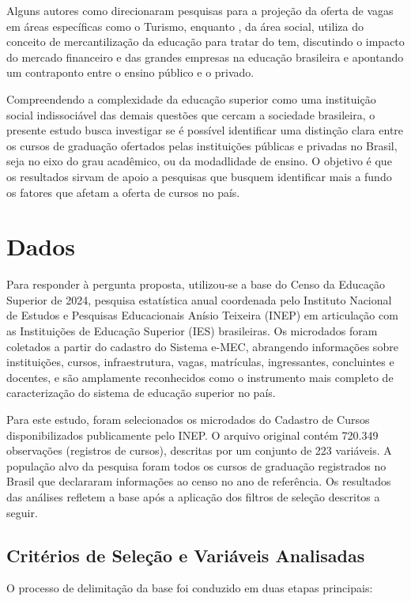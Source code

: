 \documentclass[12pt]{article}
\begin{document}
Alguns autores como \textcite{motaEDUCACAOSUPERIOREM2012} direcionaram pesquisas para a projeção da oferta de vagas em áreas específicas como o Turismo, enquanto \textcite{carvalhoMercantilizacaoEducacaoSuperior2013}, da área social, utiliza do conceito de mercantilização da educação para tratar do tem, discutindo o impacto do mercado financeiro e das grandes empresas na educação brasileira e apontando um contraponto entre o ensino público e o privado.

Compreendendo a complexidade da educação superior como uma instituição social indissociável das demais questões que cercam a sociedade brasileira, o presente estudo busca investigar se é possível identificar uma distinção clara entre os cursos de graduação ofertados pelas instituições públicas e privadas no Brasil, seja no eixo do grau acadêmico, ou da modadlidade de ensino. O objetivo é que os resultados sirvam de apoio a pesquisas que busquem identificar mais a fundo os fatores que afetam a oferta de cursos no país.

\section{Dados}
Para responder à pergunta proposta, utilizou-se a base do Censo da Educação Superior de 2024, pesquisa estatística anual coordenada pelo Instituto Nacional de Estudos e Pesquisas Educacionais Anísio Teixeira (INEP) em articulação com as Instituições de Educação Superior (IES) brasileiras. Os microdados foram coletados a partir do cadastro do Sistema e-MEC, abrangendo informações sobre instituições, cursos, infraestrutura, vagas, matrículas, ingressantes, concluintes e docentes, e são amplamente reconhecidos como o instrumento mais completo de caracterização do sistema de educação superior no país.

Para este estudo, foram selecionados os microdados do Cadastro de Cursos disponibilizados publicamente pelo INEP. O arquivo original contém 720.349 observações (registros de cursos), descritas por um conjunto de 223 variáveis. A população alvo da pesquisa foram todos os cursos de graduação registrados no Brasil que declararam informações ao censo no ano de referência. Os resultados das análises refletem a base após a aplicação dos filtros de seleção descritos a seguir.

\subsection{Critérios de Seleção e Variáveis Analisadas}
O processo de delimitação da base foi conduzido em duas etapas principais:
\end{document}
